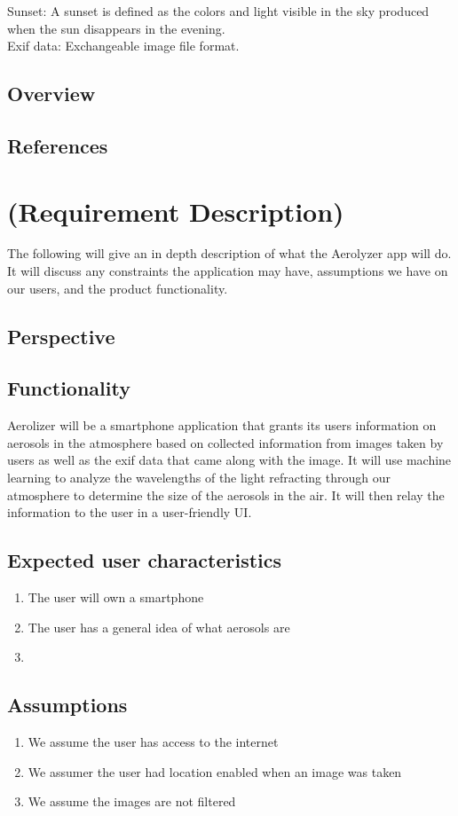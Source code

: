 \documentclass[journal,10pt,draftclsnofoot,onecolumn]{IEEEtran}
\begin{document}
\begin{singlespace}
Sunset: A sunset is defined as the colors and light visible in the sky produced when the sun disappears in the evening.\\

Exif data: Exchangeable image file format.\\

\subsection{Overview}

\subsection{References}
\section{(Requirement Description)}
The following will give an in depth description of what the Aerolyzer app will do. It will discuss any constraints the application may have, assumptions we have on our users, and the product functionality.
\subsection{Perspective}

\subsection{Functionality}
Aerolizer will be a smartphone application that grants its users information on aerosols in the atmosphere based on collected information from images taken by users as well as the exif data that came along with the image. It will use machine learning to analyze the wavelengths of the light refracting through our atmosphere to determine the size of the aerosols in the air. It will then relay the information to the user in a user-friendly UI. 
\subsection{Expected user characteristics}
\begin{enumerate}
\item The user will own a smartphone
\item The user has a general idea of what aerosols are
\item 
\end{enumerate}

\subsection{Assumptions}
\begin{enumerate}
\item We assume the user has access to the internet
\item We assumer the user had location enabled when an image was taken
\item We assume the images are not filtered
\end{enumerate}


\end{singlespace}
\end{document}
